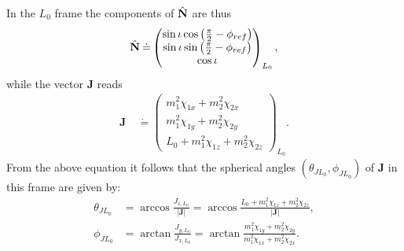 \documentclass[%
aps,
prd,
amssymb,
amsmath,
amsfonts,
eqsecnum,
showpacs,
nofootinbib,
floatfix,
twocolumn,
twoside,
a4paper,
superscriptaddress
]{revtex4-1}
\newcommand{\hN}{{\hat{\bf{N}}}}
\newcommand{\J}{\mathbf{J}}
\begin{document}
In the $L_0$ frame the components of $\hN$ are thus
\begin{equation}
\label{eq:NinLframe}
        \hN \:\dot=\begin{pmatrix} \sin \iota \cos \left( \frac{\pi}{2} - \phi_{ref} \right) \\ \sin \iota \sin \left( \frac{\pi}{2} - \phi_{ref} \right) \\ \cos \iota \end{pmatrix}_{L_0},
\end{equation}
%
while the vector $\J$ reads
\begin{align}
\label{eq:JinLframe}
 \J \:&\dot=  \begin{pmatrix} m_1^2 \chi_{1x} + m_2^2 \chi_{2x} \\  m_1^2 \chi_{1y} + m_2^2 \chi_{2y} \\ L_0 + m_1^2 \chi_{1z} + m_2^2 \chi_{2z} \end{pmatrix}_{L_0}.
\end{align}
From the above equation it follows that the spherical angles $(\theta_{JL_0},\phi_{JL_0})$ of $\J$ in this frame are given by:
\begin{align}
    \theta_{JL_0} &= \arccos \frac{J_{z,L_0}}{|\J|} = \arccos \frac{ L_0 + m_1^2 \chi_{1z} + m_2^2 \chi_{2z} }{|\J|}, \\
    \phi_{JL_0} &= \arctan \frac{J_{y,L_0}}{J_{x,L_0}} = \arctan \frac{  m_1^2 \chi_{1y} + m_2^2 \chi_{2y} }{ m_1^2 \chi_{1x} + m_2^2 \chi_{2x} }.
\end{align}
\end{document}
